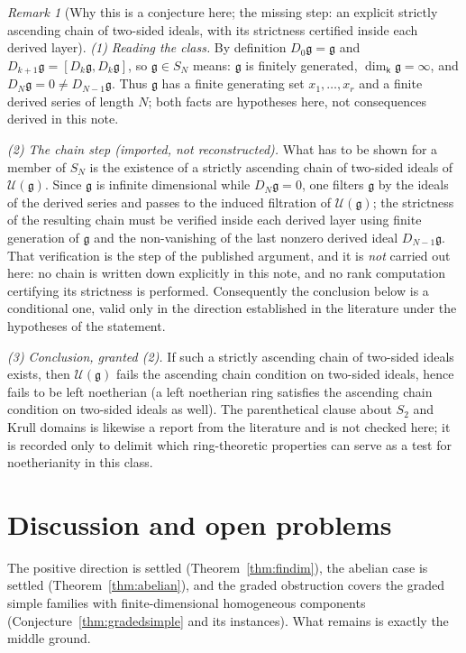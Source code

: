 \documentclass[11pt]{ctexart}
\theoremstyle{plain}
\theoremstyle{definition}
\theoremstyle{remark}
\newtheorem{remark}[theorem]{Remark}
\newcommand{\kk}{\mathsf{k}}
\newcommand{\gl}{\mathfrak{g}}
\newcommand{\UU}{\mathcal{U}}
\begin{document}
\begin{remark}[Why this is a conjecture here; the missing step: an explicit strictly ascending chain of two-sided ideals, with its strictness certified inside each derived layer]\label{rem:solvable-missing}
\emph{(1) Reading the class.} By definition $D_0\gl=\gl$ and
$D_{k+1}\gl=[D_k\gl,D_k\gl]$, so $\gl\in S_N$ means: $\gl$ is finitely generated,
$\dim_\kk\gl=\infty$, and $D_N\gl=0\neq D_{N-1}\gl$. Thus $\gl$ has a finite
generating set $x_1,\dots,x_r$ and a finite derived series of length $N$; both facts
are hypotheses here, not consequences derived in this note.

\emph{(2) The chain step (imported, not reconstructed).} What has to be shown for a
member of $S_N$ is the existence of a strictly ascending chain of two-sided ideals of
$\UU(\gl)$. Since $\gl$ is infinite dimensional while $D_N\gl=0$, one filters $\gl$ by
the ideals of the derived series and passes to the induced filtration of $\UU(\gl)$;
the strictness of the resulting chain must be verified inside each derived layer using
finite generation of $\gl$ and the non-vanishing of the last nonzero derived ideal
$D_{N-1}\gl$. That verification is the step of the published argument, and it is
\emph{not} carried out here: no chain is written down explicitly in this note, and no
rank computation certifying its strictness is performed. Consequently the conclusion
below is a conditional one, valid only in the direction established in the literature
under the hypotheses of the statement.

\emph{(3) Conclusion, granted (2).} If such a strictly ascending chain of two-sided
ideals exists, then $\UU(\gl)$ fails the ascending chain condition on two-sided
ideals, hence fails to be left noetherian (a left noetherian ring satisfies the
ascending chain condition on two-sided ideals as well). The parenthetical clause about
$S_2$ and Krull domains is likewise a report from the literature and is not checked
here; it is recorded only to delimit which ring-theoretic properties can serve as a
test for noetherianity in this class.
\end{remark}

\section{Discussion and open problems}\label{sec:open}

The positive direction is settled (Theorem~\ref{thm:findim}), the abelian case is
settled (Theorem~\ref{thm:abelian}), and the graded obstruction covers the graded
simple families with finite-dimensional homogeneous components
(Conjecture~\ref{thm:gradedsimple} and its instances). What remains is exactly the middle
ground.
\end{document}
